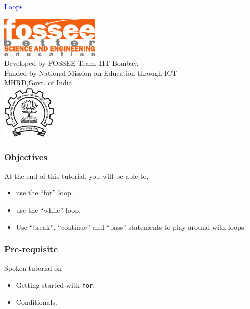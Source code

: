 \documentclass[presentation]{beamer}
\title{}
\author{FOSSEE}
\date{}
\begin{document}
\begin{frame}

\begin{center}
\vspace{12pt}
\textcolor{blue}{\huge Loops}
\end{center}
\vspace{18pt}
\begin{center}
\vspace{10pt}
\includegraphics[scale=0.95]{../images/fossee-logo.png}\\
\vspace{5pt}
\scriptsize Developed by FOSSEE Team, IIT-Bombay. \\ 
\scriptsize Funded by National Mission on Education through ICT\\
\scriptsize  MHRD,Govt. of India\\
\includegraphics[scale=0.30]{../images/iitb-logo.png}\\
\end{center}
\end{frame}
\begin{frame}
\frametitle{Objectives}
\label{sec-2}

  At the end of this tutorial, you will be able to,


\begin{itemize}
\item use the ``for'' loop.
\item use the ``while'' loop.
\item Use ``break'', ``continue'' and ``pass'' statements to play around
   with loops.
\end{itemize}
\end{frame}
\begin{frame}
\frametitle{Pre-requisite}
\label{sec-3}

Spoken tutorial on -

\begin{itemize}
\item Getting started with \verb~for~.
\item Conditionals.
\end{itemize}
\end{frame}
\end{document}
